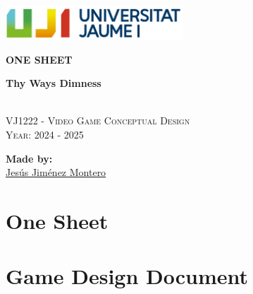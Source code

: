 \documentclass[12pt]{article}
\newcommand{\gameTitle}{\textbf{Thy Ways Dimness}}
\begin{document}
\begin{titlepage}
    \centering
    \vspace*{5cm}

    \includegraphics[width=0.5\textwidth]{Imagenes/marca-uji-color.jpg}\par\vspace{1cm}

    {\Huge \bfseries ONE SHEET \par}
    {\large \bfseries \gameTitle \par}

    \textsc{\large }
    \vspace{0.5cm} \\
    \textsc{\Large VJ1222 - Video Game Conceptual Design}
    \vspace{0.5cm} \\
    \textsc{\large Year: 2024 - 2025}
    \vfill

    \textbf{Made by:}         \\
    \href{https://www.richardotomislav.com/}{Jesús Jiménez Montero }      \\

    \vspace{1cm}

    \vfill
\end{titlepage}


\renewcommand{\contentsname}{Table of Contents}
\tableofcontents
\newpage



\section*{One Sheet}

\section*{Game Design Document}

\end{document}
